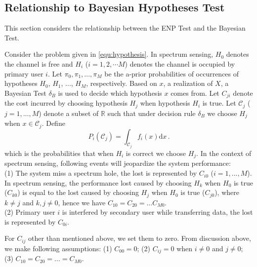 \subsection{Relationship to Bayesian Hypotheses Test}
This section considers  the relationship between the ENP Test and the Bayesian Test. 

Consider the problem given in \eqref{equ:hypothesis}. 
In spectrum sensing, $H_0$ denotes the channel is free and $H_i$ ($i = 1, 2, \cdots M$) denotes the channel is occupied by primary user $i$. 
Let $\pi_0, \pi_1, ..., \pi_M$ be the a-prior probabilities of occurrences of hypotheses $H_0$, $H_1$, ..., $H_M$, respectively. 
Based on $x$, a realization of $X$, a Bayesian Test $\delta_B$ is used to decide which hypothesis $x$ comes from.  
Let $C_{ji}$ denote the cost incurred by choosing hypothesis $H_j$ when hypothesis $H_i$ is true. 
Let $\mathcal{C}_j$ ($j=1, ..., M$) denote a subset of $\mathbb{R}$ such that under decision rule $\delta_B$ we choose $H_j$ when $x \in \mathcal{C}_j$. 
Define
\[
P_i(\mathcal{C}_j) = \int_{\mathcal{C}_j} f_i(x)\mathrm{d}x\,.
\]
which is the probabilities that when $H_i$ is correct we choose $H_j$.
In the context of spectrum sensing, following events will jeopardize the system performance:
\\(1) The system miss a spectrum hole, the lost is represented by $C_{i0}$ ($i = 1, ..., M$). In spectrum sensing, the performance lost caused by choosing $H_k$ when $H_0$ is true ($C_{k0}$) is equal to the lost caused by choosing $H_j$ when $H_0$ is true ($C_{j0}$), where $k \neq j$ and $k, j \neq 0$, hence we have $C_{10} = C_{20} = ... C_{M0}$.
\\(2) Primary user $i$ is interfered by secondary user while transferring data, the lost is represented by $C_{0i}$. 

For $C_{ij}$ other than mentioned above, we set them to zero. 
From discussion above,  we make following assumptions:
(1) $C_{00} = 0$;
(2) $C_{ij} = 0$ when $i \neq 0$ and $j \neq 0$;
(3) $C_{10} = C_{20} = ... = C_{M0}$.

